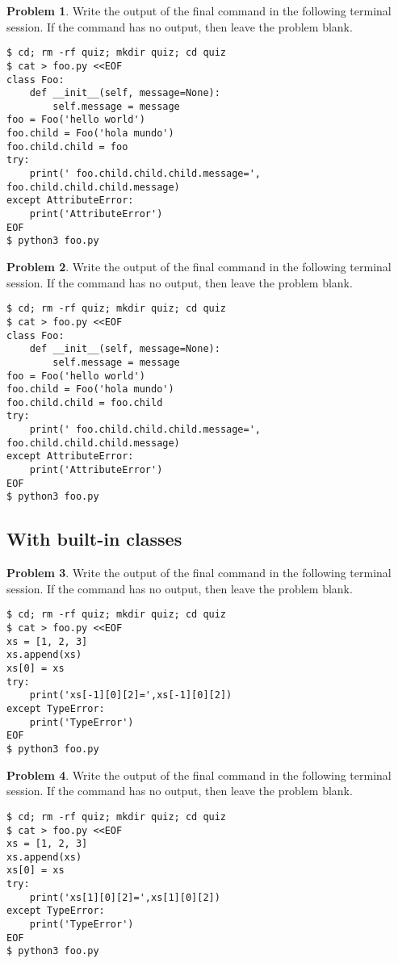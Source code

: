 \documentclass[10pt]{article}
\theoremstyle{definition}
\newtheorem{problem}{Problem}
\begin{document}
\filbreak
\begin{problem}
    Write the output of the final command in the following terminal session.
    If the command has no output, then leave the problem blank.
\end{problem}
\begin{lstlisting}
$ cd; rm -rf quiz; mkdir quiz; cd quiz
$ cat > foo.py <<EOF
class Foo:
    def __init__(self, message=None):
        self.message = message
foo = Foo('hello world')
foo.child = Foo('hola mundo')
foo.child.child = foo
try:
    print(' foo.child.child.child.message=', foo.child.child.child.message)
except AttributeError:
    print('AttributeError') 
EOF
$ python3 foo.py
\end{lstlisting}


\filbreak
\begin{problem}
    Write the output of the final command in the following terminal session.
    If the command has no output, then leave the problem blank.
\end{problem}
\begin{lstlisting}
$ cd; rm -rf quiz; mkdir quiz; cd quiz
$ cat > foo.py <<EOF
class Foo:
    def __init__(self, message=None):
        self.message = message
foo = Foo('hello world')
foo.child = Foo('hola mundo')
foo.child.child = foo.child
try:
    print(' foo.child.child.child.message=', foo.child.child.child.message)
except AttributeError:
    print('AttributeError') 
EOF
$ python3 foo.py
\end{lstlisting}

\subsection{With built-in classes}

\filbreak
\begin{problem}
    Write the output of the final command in the following terminal session.
    If the command has no output, then leave the problem blank.
\end{problem}
\begin{lstlisting}
$ cd; rm -rf quiz; mkdir quiz; cd quiz
$ cat > foo.py <<EOF
xs = [1, 2, 3]
xs.append(xs)
xs[0] = xs
try:
    print('xs[-1][0][2]=',xs[-1][0][2])
except TypeError:
    print('TypeError')
EOF
$ python3 foo.py
\end{lstlisting}

\filbreak
\begin{problem}
    Write the output of the final command in the following terminal session.
    If the command has no output, then leave the problem blank.
\end{problem}
\begin{lstlisting}
$ cd; rm -rf quiz; mkdir quiz; cd quiz
$ cat > foo.py <<EOF
xs = [1, 2, 3]
xs.append(xs)
xs[0] = xs
try:
    print('xs[1][0][2]=',xs[1][0][2])
except TypeError:
    print('TypeError')
EOF
$ python3 foo.py
\end{lstlisting}
\end{document}
